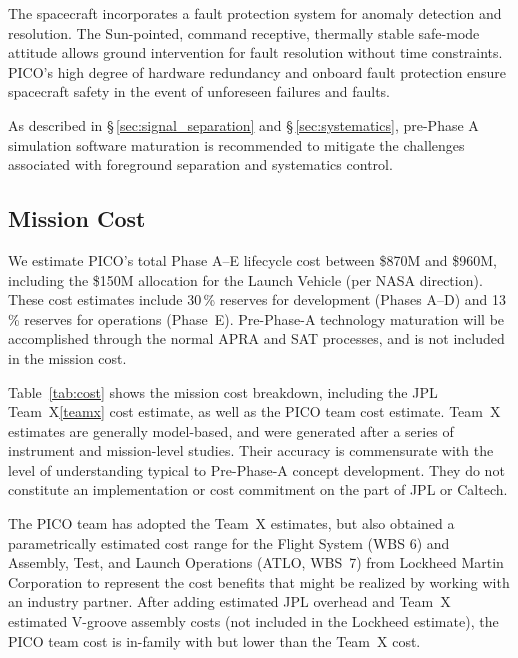 The spacecraft incorporates a fault protection system for anomaly
detection and resolution. The Sun-pointed, command receptive,
thermally stable safe-mode attitude allows ground intervention for
fault resolution without time constraints. PICO's high degree of
hardware redundancy and onboard fault protection ensure spacecraft
safety in the event of unforeseen failures and faults.

As described in \S\,\ref{sec:signal_separation} and
\S\,\ref{sec:systematics}, pre-Phase A simulation software maturation
is recommended to mitigate the challenges associated with foreground
separation and systematics control.


\medskip
\subsection{Mission Cost}
\label{sec:mission_cost} %
%
%

We estimate PICO's total Phase A--E lifecycle cost between \$870M and \$960M, including the \$150M allocation for the Launch Vehicle (per NASA direction). These cost estimates include 30\,\% reserves for development (Phases A--D) and 13\,\% reserves for operations (Phase~E). Pre-Phase-A technology maturation 
will be accomplished through the normal APRA and SAT processes, and is not included in the mission cost. 

Table~\ref{tab:cost} shows the mission cost breakdown, including the JPL Team~X\cref{teamx} cost estimate, as well as the PICO team cost estimate. Team~X estimates are generally model-based, and were generated after a series of instrument and mission-level studies. Their accuracy is commensurate with the level of understanding typical to Pre-Phase-A concept development. They do not constitute an implementation or cost commitment on the part of JPL or Caltech.

The PICO team has adopted the Team~X estimates, but also obtained a parametrically estimated cost range for the Flight System (WBS 6) and Assembly, Test, and Launch Operations (ATLO, WBS~7) from Lockheed Martin Corporation to represent the cost benefits that might be realized by working with an industry partner. After adding estimated JPL overhead and Team~X estimated V-groove assembly costs (not included in the Lockheed estimate), the PICO team cost is in-family with but lower than the Team~X cost.

